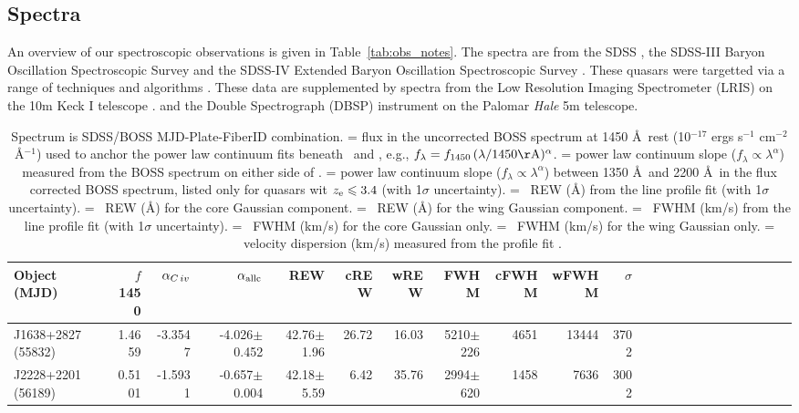 \documentclass[a4paper,fleqn,usenatbib]{mnras}
\begin{document}
\subsection{Spectra}
An overview of our spectroscopic observations is given in Table~\ref{tab:obs_notes}. 
The spectra are from the SDSS \citep{Stoughton2002, DR7, Schneider2010},  
the SDSS-III Baryon Oscillation Spectroscopic Survey \citep[BOSS][]{Eisenstein2011, Dawson2013, Smee2013, Alam2015, Paris2017} 
and the SDSS-IV  Extended Baryon Oscillation Spectroscopic Survey \citep[eBOSS; ][]{Dawson2016, Abolfathi2018}. 
These quasars were targetted via a range of techniques and algorithms \citep[][]{Richards2002, Ross2012, 
Myers2015}.  
These data are supplemented by spectra from 
the Low Resolution Imaging Spectrometer (LRIS) on the 10m Keck {\sc I} telescope \citep{Oke1995}. 
and the Double Spectrograph (DBSP) instrument on the Palomar {\it Hale} 5m telescope. 

\begin{table*}
\begin{tabular}{ l rrrr rrrr rrrr rrrr rrrr rr|}
\hline
\hline 
Object (MJD)               & $f$1450 & $\alpha_{\civ}$    & $\alpha_{\rm allc}$    & REW                       & cREW   &  wREW  & FWHM              & cFWHM  &  wFWHM  & $\sigma$     \\
\hline 
J1638+2827 (55832) & 1.4659    & -3.3547             & -4.026$\pm$0.452 & 42.76$\pm$1.96  & 26.72  & 16.03  & 5210$\pm$226 & 4651      & 13444    & 3702          \\
J2228+2201 (56189) & 0.5101    & -1.5931             & -0.657$\pm$0.004 & 42.18$\pm$5.59  &  6.42   & 35.76  & 2994$\pm$620 & 1458      &   7636    & 3002           \\
\hline
\end{tabular}
 \caption{
Spectrum is SDSS/BOSS MJD-Plate-FiberID combination. 
 = flux in the uncorrected BOSS spectrum at 1450 \AA\ rest (10$^{-17}$ ergs s$^{-1}$ cm$^{-2}$ \AA$^{-1}$) used to anchor the power law continuum fits beneath \civ\ and \nv , e.g., $f_{\lambda} = f_{1450}\, (\lambda /1450{\rm \AA})^{\alpha}$.
 = power law continuum slope ($f_{\lambda}\propto \lambda^{\alpha}$) measured from the BOSS spectrum on either side of \civ .
 = power law continuum slope ($f_{\lambda}\propto \lambda^{\alpha}$) between 1350 \AA\ and 2200 \AA\ in the flux corrected BOSS spectrum, listed only for quasars wit $z_{\rm e} \le 3.4$ (with 1$\sigma$ uncertainty). 
 = \civ\ REW (\AA ) from the line profile fit (with 1$\sigma$ uncertainty). 
 = \civ\ REW (\AA ) for the core Gaussian component.
 = \civ\ REW (\AA ) for the wing Gaussian component.
 = \civ\ FWHM (km/s) from the line profile fit (with 1$\sigma$ uncertainty). 
 = \civ\ FWHM (km/s) for the core Gaussian only.
 = \civ\ FWHM (km/s) for the wing Gaussian only.
\noindent {\tt $\sigma$} = \civ\ velocity dispersion (km/s) measured from the profile fit \citep{Peterson2004}.
} 
 \label{tab:Ham17_lines}
\end{table*}
\end{document}
